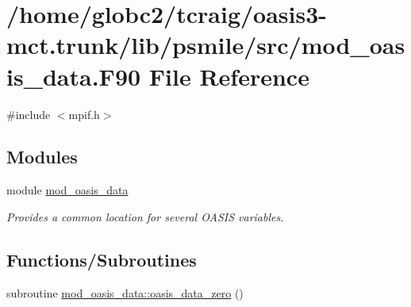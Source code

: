 \hypertarget{mod__oasis__data_8_f90}{}\section{/home/globc2/tcraig/oasis3-\/mct.trunk/lib/psmile/src/mod\+\_\+oasis\+\_\+data.F90 File Reference}
\label{mod__oasis__data_8_f90}
{\ttfamily \#include $<$mpif.\+h$>$}\newline
\subsection*{Modules}
\begin{DoxyCompactItemize}
\item 
module \hyperlink{namespacemod__oasis__data}{mod\+\_\+oasis\+\_\+data}
\begin{DoxyCompactList}\small\item\em Provides a common location for several O\+A\+S\+IS variables. \end{DoxyCompactList}\end{DoxyCompactItemize}
\subsection*{Functions/\+Subroutines}
\begin{DoxyCompactItemize}
\item 
subroutine \hyperlink{namespacemod__oasis__data_a7a3b7c8004b8d8869bbfa1fd4723da3e}{mod\+\_\+oasis\+\_\+data\+::oasis\+\_\+data\+\_\+zero} ()
\end{DoxyCompactItemize}
